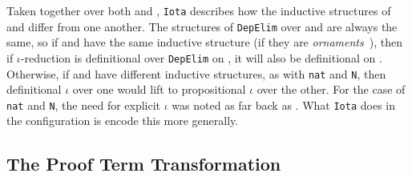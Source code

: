 Taken together over both \A and \B, \lstinline{Iota} describes how the inductive structures of \A and \B differ from one another.
The structures of \lstinline{DepElim} over \A and \B are always the same, so if \A and \B have the same 
inductive structure (if they are \textit{ornaments}~\cite{mcbride}),
then if $\iota$-reduction is definitional over \lstinline{DepElim} on \A, it will also be definitional on \B.
Otherwise, if \A and \B have different inductive structures, as with \lstinline{nat} and \lstinline{N},
then definitional $\iota$ over one would lift to propositional $\iota$ over the other.
For the case of \lstinline{nat} and \lstinline{N},
the need for explicit $\iota$ was noted as far back as \citet{magaud2000changing}.
What \lstinline{Iota} does in the configuration is encode this more generally.

\subsection{The Proof Term Transformation}
\label{sec:generic}

